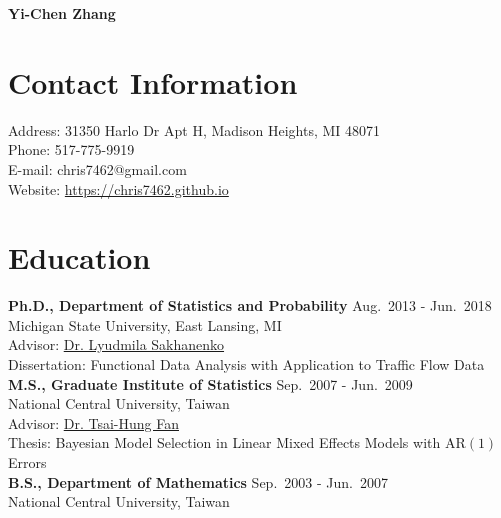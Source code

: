 \documentclass[a4paper,10pt,dvipdfmx]{article}
\begin{document}
\begin{center}
  {\huge \textbf{Yi-Chen Zhang}}
\end{center}

\section*{Contact Information}
\indent Address: 31350 Harlo Dr Apt H, Madison Heights, MI 48071\\
\indent Phone: 517-775-9919\\
\indent E-mail: chris7462@gmail.com\\
\indent Website: \href{https://chris7462.github.io}{https://chris7462.github.io}\\

\section*{Education}
\indent \textbf{Ph.D., Department of Statistics and Probability} \hfill Aug.~2013 - Jun.~2018\\
\indent Michigan State University, East Lansing, MI\\
\indent Advisor: \href{https://www.stt.msu.edu/users/luda/}{Dr. Lyudmila Sakhanenko}\\
\indent Dissertation: Functional Data Analysis with Application to Traffic Flow Data\\

\indent \textbf{M.S., Graduate Institute of Statistics} \hfill Sep.~2007 - Jun.~2009\\
\indent National Central University, Taiwan\\
\indent Advisor: \href{http://www.stat.ncu.edu.tw/teacher/THFan/index.htm}{Dr. Tsai-Hung Fan}\\
\indent Thesis: Bayesian Model Selection in Linear Mixed Effects Models with AR$(1)$ Errors\\

\indent \textbf{B.S., Department of Mathematics} \hfill Sep.~2003 - Jun.~2007\\
\indent National Central University, Taiwan
\end{document}
